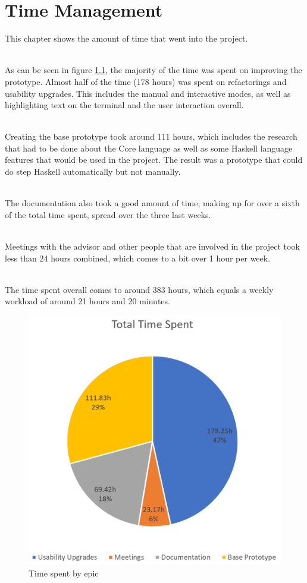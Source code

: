 \chapter{Time Management}
This chapter shows the amount of time that went into the project.

\ \\
As can be seen in figure \ref*{fig:timeTracking},
the majority of the time was spent on improving the prototype.
Almost half of the time (178 hours) was spent on refactorings and usability upgrades.
This includes the manual and interactive modes, as well as highlighting text on the terminal and the user interaction overall.

\ \\
Creating the base prototype took around 111 hours,
which includes the research that had to be done about the Core language as well as some Haskell language features that would be used in the project.
The result was a prototype that could do step Haskell automatically but not manually.

\ \\
The documentation also took a good amount of time,
making up for over a sixth of the total time spent, spread over the three last weeks.

\ \\
Meetings with the advisor and other people that are involved in the project took less than 24 hours combined,
which comes to a bit over 1 hour per week.

\ \\
The time spent overall comes to around 383 hours, which equals a weekly workload of around 21 hours and 20 minutes.

\begin{figure}
    \includegraphics[width=1\textwidth]{resources/time_tracking.PNG}
    \caption{Time spent by epic}
    \label{fig:timeTracking}
\end{figure}

